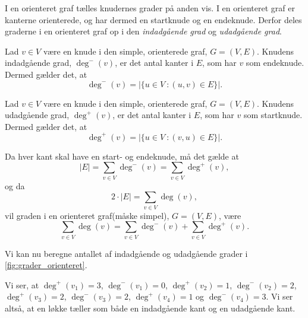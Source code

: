 I en orienteret graf tælles knudernes grader på anden vis. I en orienteret graf er kanterne orienterede, og har dermed en startknude og en endeknude. Derfor deles graderne i en orienteret graf op i den \emph{indadgående grad} og \emph{udadgående grad}. 

\begin{defn}
Lad $v \in V$ være en knude i den simple, orienterede graf, $G = (V,E)$. Knudens indadgående grad, $\deg^-(v)$, er det antal kanter i $E$, som har $v$ som endeknude. Dermed gælder det, at
\begin{equation}
\deg^-(v)=|\{u \in V\ : (u,v) \in E \}|.
\end{equation}
\end{defn}

\begin{defn}
Lad $v \in V$ være en knude i den simple, orienterede graf, $G = (V,E)$. Knudens udadgående grad, $\deg^+(v)$, er det antal kanter i $E$, som har $v$ som startknude. Dermed gælder det, at
\begin{equation}
\deg^+(v)=|\{u \in V\ : (v,u) \in E \}|.
\end{equation}
\end{defn}

\begin{defn}
Da hver kant skal have en start- og endeknude, må det gælde at 
\begin{equation}
|E|= \sum_{v \in V} { } \deg^{-}(v) = \sum_{v \in V} { } \deg^{+}(v),
\end{equation}
og da 
\begin{equation}
2 \cdot |E|= \sum_{v \in V} { } \deg(v),
\end{equation} 
vil graden i en orienteret graf(måske simpel), $G = (V,E)$, være 
\begin{equation}
\sum_{v \in V} { } \deg(v) = \sum_{v \in V} { } \deg^{-}(v) + \sum_{v \in V} { } \deg^{+}(v).
\end{equation}
\end{defn}

\begin{exmp} \label{ex:grader_orienteret}
Vi kan nu beregne antallet af indadgående og udadgående grader i \autoref{fig:grader_orienteret}.

Vi ser, at $\deg^{+}(v_{1})=3$, $\deg^{-}(v_{1})=0$, $\deg^{+}(v_{2})=1$, $\deg^{-}(v_{2})=2$, $\deg^{+}(v_{3})=2$, $\deg^{-}(v_{3})=2$, $\deg^{+}(v_{4})=1$ og $\deg^{-}(v_{4})=3$. Vi ser altså, at en løkke tæller som både en indadgående kant og en udadgående kant.
\end{exmp}

